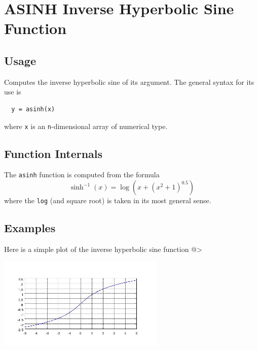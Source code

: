\section{ASINH Inverse Hyperbolic Sine Function}

\subsection{Usage}

Computes the inverse hyperbolic sine of its argument.  The general
syntax for its use is
\begin{verbatim}
  y = asinh(x)
\end{verbatim}
where \verb|x| is an \verb|n|-dimensional array of numerical type.
\subsection{Function Internals}

The \verb|asinh| function is computed from the formula
\[
   \sinh^{-1}(x) = \log\left(x + (x^2 + 1)^0.5\right)
\]
where the \verb|log| (and square root) is taken in its most general sense.
\subsection{Examples}

Here is a simple plot of the inverse hyperbolic sine function
@>


\centerline{\includegraphics[width=8cm]{asinhplot}}

